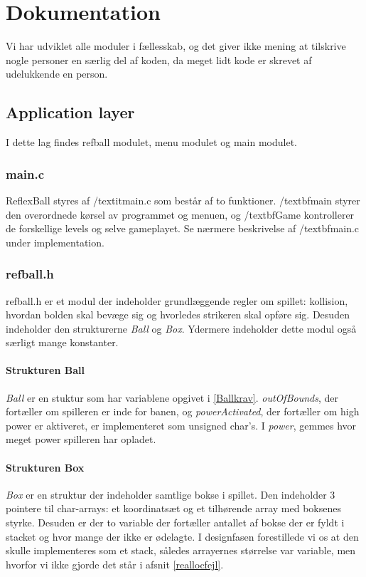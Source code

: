 \section{Dokumentation}
Vi har udviklet alle moduler i fællesskab, og det giver ikke mening at tilskrive nogle personer en særlig del af koden, da meget lidt kode er skrevet af udelukkende en person. 

\subsection{Application layer}
I dette lag findes refball modulet, menu modulet og main modulet.
\subsubsection{main.c}
ReflexBall styres af /textit{main.c} som består af to funktioner. /textbf{main} styrer den overordnede kørsel av programmet og menuen, og /textbf{Game} kontrollerer de forskellige levels og selve gameplayet. Se nærmere beskrivelse af /textbf{main.c} under implementation.

\subsubsection{refball.h}
refball.h er et modul der indeholder grundlæggende regler om spillet: kollision, hvordan bolden skal bevæge sig og hvorledes strikeren skal opføre sig. Desuden indeholder den strukturerne \textit{Ball} og \textit{Box}. Ydermere indeholder dette modul også særligt mange konstanter.
\paragraph{Strukturen Ball}
\textit{Ball} er en stuktur som har variablene opgivet i \ref{Ballkrav}. \textit{outOfBounds}, der fortæller om spilleren er inde for banen, og \textit{powerActivated}, der fortæller om high power er aktiveret, er implementeret som unsigned char's. I \textit{power}, gemmes hvor meget power spilleren har opladet.
 

\paragraph{Strukturen Box}
\textit{Box} er en struktur der indeholder samtlige bokse i spillet. Den indeholder 3 pointere til char-arrays: et koordinatsæt og et tilhørende array med boksenes styrke. Desuden er der to variable der fortæller antallet af bokse der er fyldt i stacket og hvor mange der ikke er ødelagte. I designfasen forestillede vi os at den skulle implementeres som et stack, således arrayernes størrelse var variable, men hvorfor vi ikke gjorde det står i afsnit \ref{reallocfejl}.
